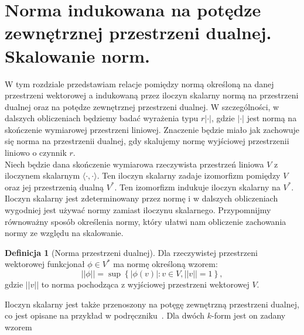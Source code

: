 \documentclass[licencjacka]{pracamgr}
\theoremstyle{definition}
\newtheorem{definition}{Definicja}[section]
\theoremstyle{definition}
\theoremstyle{plain}
\theoremstyle{plain}
\theoremstyle{plain}
\theoremstyle{plain}
\theoremstyle{plain}
\begin{document}
\section{Norma indukowana na potędze zewnętrznej przestrzeni dualnej.
Skalowanie norm.}\label{norm-scaling}

W tym rozdziale przedstawiam relacje pomiędzy normą określoną na danej
przestrzeni wektorowej a indukowaną przez iloczyn skalarny normą na przestrzeni
dualnej oraz na potędze zewnętrznej przestrzeni dualnej.  W szczególności, w
dalszych obliczeniach będziemy badać wyrażenia typu $r |\cdot|$, gdzie
$|\cdot|$ jest normą na skończenie wymiarowej przestrzeni liniowej.  Znaczenie
będzie miało jak zachowuje się norma na przestrzenii dualnej, gdy skalujemy
normę wyjściowej przestrzenii liniowo o czynnik $r$. \\

Niech będzie dana skończenie wymiarowa rzeczywista przestrzeń liniowa $V$ z
iloczynem skalarnym $\langle \cdot, \cdot \rangle$.  Ten iloczyn skalarny
zadaje izomorfizm pomiędzy $V$ oraz jej przestrzenią dualną $V^\ast$. 
Ten izomorfizm indukuje iloczyn skalarny na $V^\ast$.  Iloczyn skalarny jest
zdeterminowany przez normę i w dalszych obliczeniach wygodniej jest używać
normy zamiast iloczynu skalarnego.  Przypomnijmy równoważny sposób określenia
normy, który ułatwi nam obliczenie zachowania normy ze względu na skalowanie.  

\begin{definition}[Norma przestrzeni dualnej]
Dla rzeczywistej przestrzeni wektorowej funkcjonał $\phi \in V^\ast$ ma
normę określoną wzorem:
\begin{equation}\label{norm-of-functional}
||\phi|| = \sup \left\{ |\phi(v)|: v \in V, ||v|| = 1 \right\},
\end{equation}
gdzie $||v||$ to norma pochodząca z wyjściowej przestrzeni wektorowej $V$.  \\
\end{definition}

Iloczyn skalarny jest także przenoszony na potęgę zewnętrzną przestrzeni
dualnej, co jest opisane na przykład w podręczniku~\cite[Rozdział
6§3]{kostrikin}.  Dla dwóch $k$-form jest on zadany wzorem
\end{document}
